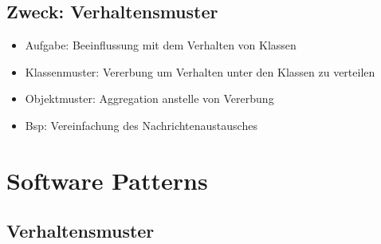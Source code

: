 \documentclass[11pt, fleqn, a4paper, leqno]{scrartcl} %
\begin{document}
		\subsection{Zweck: Verhaltensmuster}
			\begin{itemize}
				\item Aufgabe: Beeinflussung mit dem Verhalten von Klassen
				\item Klassenmuster: Vererbung um Verhalten unter den Klassen zu verteilen
				\item Objektmuster: Aggregation anstelle von Vererbung
				\item Bsp: Vereinfachung des Nachrichtenaustausches
			\end{itemize}
	\newpage
	\section{Software Patterns}
		\subsection{Verhaltensmuster}
\end{document}
